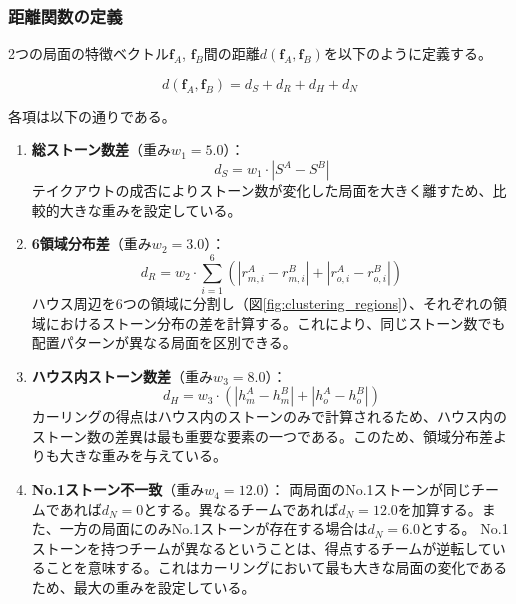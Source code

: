 \documentclass[11pt,a4j]{jreport}
\begin{document}
\begin{enumerate}
    \subsubsection{距離関数の定義}
    2つの局面の特徴ベクトル$\bm{f}_A$, $\bm{f}_B$間の距離$d(\bm{f}_A, \bm{f}_B)$を以下のように定義する。

    \begin{equation}
        d(\bm{f}_A, \bm{f}_B) = d_S + d_R + d_H + d_N
    \end{equation}

    各項は以下の通りである。

    \begin{enumerate}
        \item \textbf{総ストーン数差}（重み$w_1 = 5.0$）：
        \begin{equation}
            d_S = w_1 \cdot |S^A - S^B|
        \end{equation}
        テイクアウトの成否によりストーン数が変化した局面を大きく離すため、比較的大きな重みを設定している。

        \item \textbf{6領域分布差}（重み$w_2 = 3.0$）：
        \begin{equation}
            d_R = w_2 \cdot \sum_{i=1}^{6} \left( |r_{m,i}^A - r_{m,i}^B| + |r_{o,i}^A - r_{o,i}^B| \right)
        \end{equation}
        ハウス周辺を6つの領域に分割し（図\ref{fig:clustering_regions}）、それぞれの領域におけるストーン分布の差を計算する。これにより、同じストーン数でも配置パターンが異なる局面を区別できる。

        \item \textbf{ハウス内ストーン数差}（重み$w_3 = 8.0$）：
        \begin{equation}
            d_H = w_3 \cdot \left( |h_m^A - h_m^B| + |h_o^A - h_o^B| \right)
        \end{equation}
        カーリングの得点はハウス内のストーンのみで計算されるため、ハウス内のストーン数の差異は最も重要な要素の一つである。このため、領域分布差よりも大きな重みを与えている。

        \item \textbf{No.1ストーン不一致}（重み$w_4 = 12.0$）：
        両局面のNo.1ストーンが同じチームであれば$d_N = 0$とする。異なるチームであれば$d_N = 12.0$を加算する。また、一方の局面にのみNo.1ストーンが存在する場合は$d_N = 6.0$とする。
        No.1ストーンを持つチームが異なるということは、得点するチームが逆転していることを意味する。これはカーリングにおいて最も大きな局面の変化であるため、最大の重みを設定している。
    \end{enumerate}


\end{enumerate}
\end{document}
